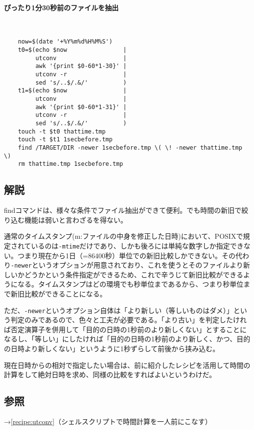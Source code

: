 \paragraph{ぴったり1分30秒前のファイルを抽出}　\\
\begin{frameboxit}{160.0mm}
\begin{verbatim}
	now=$(date '+%Y%m%d%H%M%S')
	t0=$(echo $now                |
	     utconv                   |
	     awk '{print $0-60*1-30}' |
	     utconv -r                |
	     sed 's/..$/.&/'          )
	t1=$(echo $now                |
	     utconv                   |
	     awk '{print $0-60*1-31}' |
	     utconv -r                |
	     sed 's/..$/.&/'          )
	touch -t $t0 thattime.tmp
	touch -t $t1 1secbefore.tmp
	find /TARGET/DIR -newer 1secbefore.tmp \( \! -newer thattime.tmp \)
	rm thattime.tmp 1secbefore.tmp
\end{verbatim}
\end{frameboxit}

\subsection*{解説}

findコマンドは、様々な条件でファイル抽出ができて便利。でも時間の新旧で絞り込む機能は弱いと言わざるを得ない。

通常のタイムスタンプ(m:ファイルの中身を修正した日時)において、POSIXで規定されているのは\verb|-mtime|だけであり、しかも後ろには単純な数字しか指定できない。つまり現在から1日（=86400秒）単位での新旧比較しかできない。その代わり\verb|-newer|というオプションが用意されており、これを使うとそのファイルより新しいかどうかという条件指定ができるため、これで辛うじて新旧比較ができるようになる。タイムスタンプはどの環境でも秒単位まであるから、つまり秒単位まで新旧比較ができることになる。

ただ、\verb|-newer|というオプション自体は「より新しい（等しいものはダメ）」という判定のみであるので、色々と工夫が必要である。「より古い」を判定したければ否定演算子を併用して「目的の日時の1秒前のより新しくない」とすることになるし、「等しい」にしたければ「目的の日時の1秒前のより新しく、かつ、目的の日時より新しくない」というように1秒ずらして前後から挟み込む。

現在日時からの相対で指定したい場合は、前に紹介したレシピを活用して時間の計算をして絶対日時を求め、同様の比較をすればよいというわけだ。

\subsection*{参照}

\noindent
→\ref{recipe:utconv}（シェルスクリプトで時間計算を一人前にこなす）
